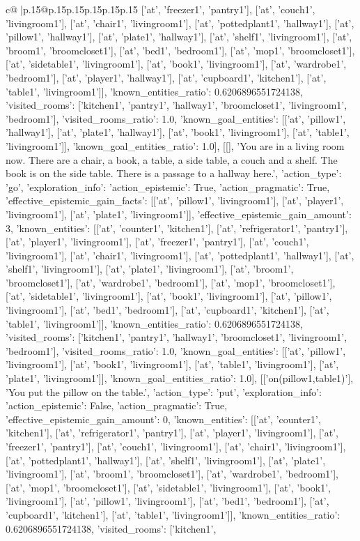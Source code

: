 \documentclass{article}
\begin{document}
{\begin{supertabular}{c@{$\;$}|p{.15\linewidth}@{}p{.15\linewidth}p{.15\linewidth}p{.15\linewidth}p{.15\linewidth}p{.15\linewidth}}
{{{['at', 'freezer1', 'pantry1'], ['at', 'couch1', 'livingroom1'], ['at', 'chair1', 'livingroom1'], ['at', 'pottedplant1', 'hallway1'], ['at', 'pillow1', 'hallway1'], ['at', 'plate1', 'hallway1'], ['at', 'shelf1', 'livingroom1'], ['at', 'broom1', 'broomcloset1'], ['at', 'bed1', 'bedroom1'], ['at', 'mop1', 'broomcloset1'], ['at', 'sidetable1', 'livingroom1'], ['at', 'book1', 'livingroom1'], ['at', 'wardrobe1', 'bedroom1'], ['at', 'player1', 'hallway1'], ['at', 'cupboard1', 'kitchen1'], ['at', 'table1', 'livingroom1']], 'known_entities_ratio': 0.6206896551724138, 'visited_rooms': ['kitchen1', 'pantry1', 'hallway1', 'broomcloset1', 'livingroom1', 'bedroom1'], 'visited_rooms_ratio': 1.0, 'known_goal_entities': [['at', 'pillow1', 'hallway1'], ['at', 'plate1', 'hallway1'], ['at', 'book1', 'livingroom1'], ['at', 'table1', 'livingroom1']], 'known_goal_entities_ratio': 1.0}}], [[], 'You are in a living room now. There are a chair, a book, a table, a side table, a couch and a shelf. The book is on the side table. There is a passage to a hallway here.', {'action_type': 'go', 'exploration_info': {'action_epistemic': True, 'action_pragmatic': True, 'effective_epistemic_gain_facts': [['at', 'pillow1', 'livingroom1'], ['at', 'player1', 'livingroom1'], ['at', 'plate1', 'livingroom1']], 'effective_epistemic_gain_amount': 3, 'known_entities': [['at', 'counter1', 'kitchen1'], ['at', 'refrigerator1', 'pantry1'], ['at', 'player1', 'livingroom1'], ['at', 'freezer1', 'pantry1'], ['at', 'couch1', 'livingroom1'], ['at', 'chair1', 'livingroom1'], ['at', 'pottedplant1', 'hallway1'], ['at', 'shelf1', 'livingroom1'], ['at', 'plate1', 'livingroom1'], ['at', 'broom1', 'broomcloset1'], ['at', 'wardrobe1', 'bedroom1'], ['at', 'mop1', 'broomcloset1'], ['at', 'sidetable1', 'livingroom1'], ['at', 'book1', 'livingroom1'], ['at', 'pillow1', 'livingroom1'], ['at', 'bed1', 'bedroom1'], ['at', 'cupboard1', 'kitchen1'], ['at', 'table1', 'livingroom1']], 'known_entities_ratio': 0.6206896551724138, 'visited_rooms': ['kitchen1', 'pantry1', 'hallway1', 'broomcloset1', 'livingroom1', 'bedroom1'], 'visited_rooms_ratio': 1.0, 'known_goal_entities': [['at', 'pillow1', 'livingroom1'], ['at', 'book1', 'livingroom1'], ['at', 'table1', 'livingroom1'], ['at', 'plate1', 'livingroom1']], 'known_goal_entities_ratio': 1.0}}], [['on(pillow1,table1)'], 'You put the pillow on the table.', {'action_type': 'put', 'exploration_info': {'action_epistemic': False, 'action_pragmatic': True, 'effective_epistemic_gain_amount': 0, 'known_entities': [['at', 'counter1', 'kitchen1'], ['at', 'refrigerator1', 'pantry1'], ['at', 'player1', 'livingroom1'], ['at', 'freezer1', 'pantry1'], ['at', 'couch1', 'livingroom1'], ['at', 'chair1', 'livingroom1'], ['at', 'pottedplant1', 'hallway1'], ['at', 'shelf1', 'livingroom1'], ['at', 'plate1', 'livingroom1'], ['at', 'broom1', 'broomcloset1'], ['at', 'wardrobe1', 'bedroom1'], ['at', 'mop1', 'broomcloset1'], ['at', 'sidetable1', 'livingroom1'], ['at', 'book1', 'livingroom1'], ['at', 'pillow1', 'livingroom1'], ['at', 'bed1', 'bedroom1'], ['at', 'cupboard1', 'kitchen1'], ['at', 'table1', 'livingroom1']], 'known_entities_ratio': 0.6206896551724138, 'visited_rooms': ['kitchen1', }}}
\end{supertabular}}
\end{document}
